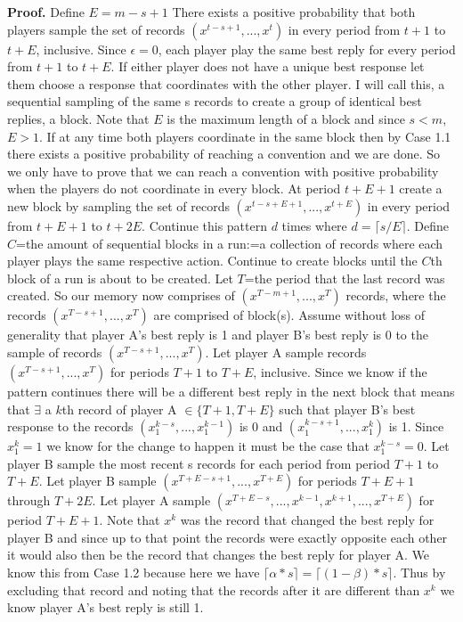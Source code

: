 \documentclass{article}
\begin{document}
\textbf{Proof.} Define $E=m-s+1$ There exists a positive probability that both players sample the set of records $(x^{t-s+1},...,x^{t})$ in every period from $t+1$ to $t+E$, inclusive. Since $\epsilon=0$, each player play the same best reply for every period from $t+1$ to $t+E$. If either player does not have a unique best response let them choose a response that coordinates with the other player. I will call this, a sequential sampling of the same s records to create a group of identical best replies, a block. Note that $E$ is the maximum length of a block and since $s<m$, $E>1$. If at any time both players coordinate in the same block then by Case 1.1 there exists a positive probability of reaching a convention and we are done. So we only have to prove that we can reach a convention with positive probability when the players do not coordinate in every block. At period $t+E+1$ create a new block by sampling the set of records $(x^{t-s+E+1},...,x^{t+E})$ in every period from $t+E+1$ to $t+2E$. Continue this pattern $d$ times where $d=\lceil s/E \rceil$. Define $C$=the amount of sequential blocks in a run:=a collection of records where each player plays the same respective action. Continue to create blocks until the $C$th block of a run is about to be created. Let $T$=the period that the last record was created. So our memory now comprises of $(x^{T-m+1},...,x^{T})$ records, where the records $(x^{T-s+1},...,x^{T})$ are comprised of block(s). Assume without loss of generality that player A's best reply is 1 and player B's best reply is 0 to the sample of records $(x^{T-s+1},...,x^{T})$. Let player A sample records $(x^{T-s+1},...,x^{T})$ for periods $T+1$ to $T+E$, inclusive. Since we know if the pattern continues there will be a different best reply in the next block that means that $\exists$ a $k$th record of player A $\in \{T+1,T+E\}$ such that player B's best response to the records $(x^{k-s}_1,...,x^{k-1}_1)$ is 0 and $(x^{k-s+1}_1,...,x^{k}_1)$ is 1. Since $x^{k}_1=1$ we know for the change to happen it must be the case that $x^{k-s}_1=0$. Let player B sample the most recent s records for each period from period $T+1$ to $T+E$. Let player B sample $(x^{T+E-s+1},...,x^{T+E})$ for periods $T+E+1$ through $T+2E$. Let player A sample $(x^{T+E-s},...,x^{k-1},x^{k+1},...,x^{T+E})$ for period $T+E+1$. Note that $x^{k}$ was the record that changed the best reply for player B and since up to that point the records were exactly opposite each other it would also then be the record that changes the best reply for player A. We know this from Case 1.2 because here we have $\lceil \alpha*s \rceil = \lceil (1-\beta)*s \rceil$. Thus by excluding that record and noting that the records after it are different than $x^{k}$ we know player A's best reply is still 1.



\vskip20pt
\end{document}
